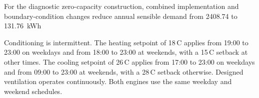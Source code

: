 



For the diagnostic zero-capacity construction, combined implementation and
boundary-condition changes reduce annual sensible demand from 2408.74 to
131.76~kWh


Conditioning is intermittent. The heating setpoint of 18\,\textdegree C applies
from 19:00 to 23:00 on weekdays and from 18:00 to 23:00 at weekends, with a
15\,\textdegree C setback at other times. The cooling setpoint of
26\,\textdegree C applies from 17:00 to 23:00 on weekdays and from 09:00 to
23:00 at weekends, with a 28\,\textdegree C setback otherwise. Designed
ventilation operates continuously. Both engines use the same weekday and
weekend schedules.


